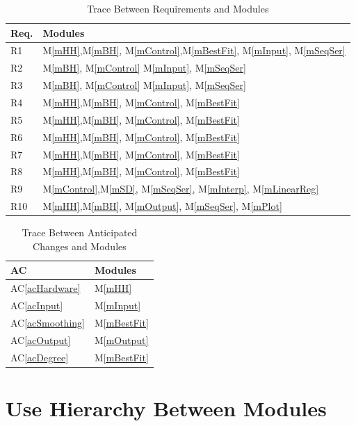 \documentclass[12pt, titlepage]{article}
\newcommand{\acref}[1]{AC\ref{#1}}
\newcommand{\mref}[1]{M\ref{#1}}
\begin{document}
\begin{table}[H]
\centering
\begin{tabular}{p{} p{}}
\toprule
\textbf{Req.} & \textbf{Modules}\\
\midrule
R1 & \mref{mHH},\mref{mBH}, \mref{mControl},\mref{mBestFit}, \mref{mInput}, \mref{mSeqSer} \\
R2 & \mref{mBH}, \mref{mControl} \mref{mInput}, \mref{mSeqSer}\\
R3 & \mref{mBH}, \mref{mControl} \mref{mInput}, \mref{mSeqSer}\\
R4 & \mref{mHH},\mref{mBH}, \mref{mControl}, \mref{mBestFit}\\
R5 & \mref{mHH},\mref{mBH}, \mref{mControl}, \mref{mBestFit}\\ 
R6 & \mref{mHH},\mref{mBH}, \mref{mControl}, \mref{mBestFit}\\
R7 & \mref{mHH},\mref{mBH}, \mref{mControl}, \mref{mBestFit}\\
R8 & \mref{mHH},\mref{mBH}, \mref{mControl}, \mref{mBestFit}\\
R9 & \mref{mControl},\mref{mSD}, \mref{mSeqSer}, \mref{mInterp}, \mref{mLinearReg}\\
R10 & \mref{mHH},\mref{mBH}, \mref{mOutput}, \mref{mSeqSer}, \mref{mPlot}\\

\bottomrule
\end{tabular}
\caption{Trace Between Requirements and Modules}
\label{TblRT}
\end{table}

\begin{table}[H]
\centering
\begin{tabular}{p{} p{}}
\toprule
\textbf{AC} & \textbf{Modules}\\
\midrule
\acref{acHardware} & \mref{mHH}\\
\acref{acInput} & \mref{mInput}\\
\acref{acSmoothing} & \mref{mBestFit}\\
\acref{acOutput} & \mref{mOutput}\\
\acref{acDegree} & \mref{mBestFit}\\
\bottomrule
\end{tabular}
\caption{Trace Between Anticipated Changes and Modules}
\label{TblACT}
\end{table}

\section{Use Hierarchy Between Modules} \label{SecUse}
\end{document}
